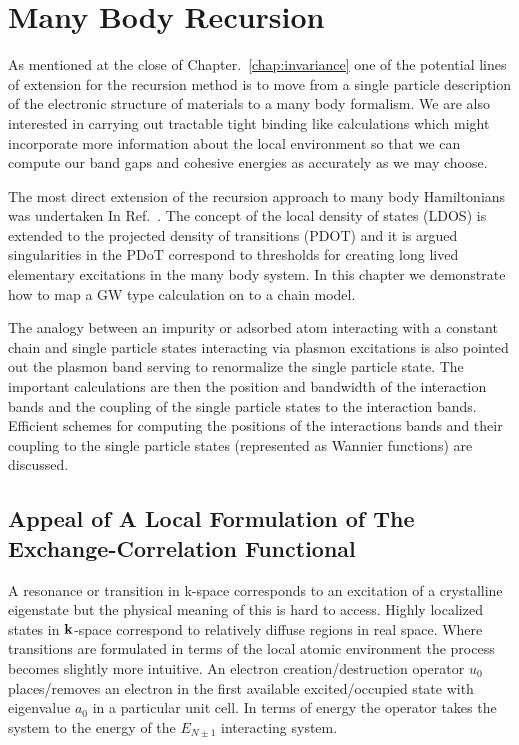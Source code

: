 \chapter{Many Body Recursion}
As mentioned at the close of Chapter.~\ref{chap:invariance} one of the potential
lines of extension for the recursion method is to move from a single particle 
description of the electronic structure of materials to a many body formalism.
We are also interested in carrying out tractable tight binding like calculations
which might incorporate more information about the local environment so that we
can compute our band gaps and cohesive energies as accurately as we may choose.

The most direct extension of the recursion approach to many body Hamiltonians 
was undertaken In Ref.~\cite{annett94}. The concept of the local density of states (LDOS)
is extended to the projected density of transitions (PDOT) and it is argued singularities
in the PDoT correspond to thresholds for creating long lived elementary excitations 
in the many body system. In this chapter we demonstrate how to map a GW type calculation
on to a chain model. 

The analogy between an impurity or adsorbed atom interacting with
a constant chain and single particle states interacting via plasmon excitations is 
also pointed out the plasmon band serving to renormalize the single particle state.
The important calculations are then the position and bandwidth of the interaction
bands and the coupling of the single particle states to the interaction bands.
Efficient schemes for computing the positions of the interactions bands and 
their coupling to the single particle states (represented as Wannier functions)
are discussed.

\section{Appeal of A Local Formulation of The Exchange-Correlation Functional}
A resonance or transition in k-space corresponds to an excitation 
of a crystalline eigenstate but the physical meaning of this is hard to access. Highly
localized states in ${\bf k}$-space correspond to relatively diffuse regions in real space. Where
transitions are formulated in terms of the local atomic environment the process becomes slightly
more intuitive. An electron creation/destruction operator $u_{0}$ places/removes an electron in the 
first available excited/occupied state with eigenvalue $a_{0}$ in a particular unit cell. 
In terms of energy the operator takes the system to the energy 
of the $E_{N\pm1}$ interacting system. 


